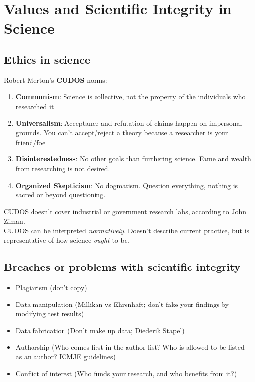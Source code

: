 \documentclass{article}
\begin{document}
 
 
 \section{Values and Scientific Integrity in Science}
    \subsection{Ethics in science}
    Robert Merton's \textbf{CUDOS} norms:
    \begin{enumerate}
        \item \textbf{Communism}: Science is collective, not the property of the individuals who researched it
        \item \textbf{Universalism}: Acceptance and refutation of claims happen on impersonal grounds. You can't accept/reject a theory because a researcher is your friend/foe
        \item \textbf{Disinterestedness}: No other goals than furthering science. Fame and wealth from researching is not desired.
        \item \textbf{Organized Skepticism}: No dogmatism. Question everything, nothing is sacred or beyond questioning.
    \end{enumerate}
    CUDOS doesn't cover industrial or government research labs, according to John Ziman.
    \\CUDOS can be interpreted \textit{normatively}. Doesn't describe current practice, but is representative of how science \textit{ought} to be.
    
    \subsection{Breaches or problems with scientific integrity}
    \begin{itemize}
        \item Plagiarism (don't copy)
        \item Data manipulation (Millikan vs Ehrenhaft; don't fake your findings by modifying test results)
        \item Data fabrication (Don't make up data; Diederik Stapel)
        \item Authorship (Who comes first in the author list? Who is allowed to be listed as an author? ICMJE guidelines)
        \item Conflict of interest (Who funds your research, and who benefits from it?)
    \end{itemize}
 
\end{document}
